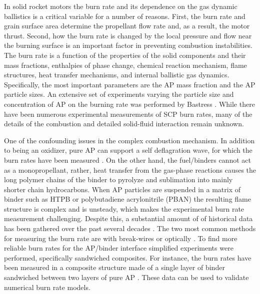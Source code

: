 \documentclass[colorinlistoftodos,review]{elsarticle}
\begin{document}
In solid rocket motors the burn rate and its dependence on the gas dynamic ballistics is a critical variable for a number of reasons.
First, the burn rate and grain surface area determine the propellant flow rate and, as a result, the motor thrust.
Second, how the burn rate is changed by the local pressure and flow near the burning surface is an important factor in preventing combustion instabilities.
The burn rate is a function of the properties of the solid components and their mass fractions, enthalpies of phase change, chemical reaction mechanism, flame structures, heat transfer mechanisms, and internal ballistic gas dynamics.
Specifically, the most important parameters are the AP mass fraction and the AP particle sizes.
An extensive set of experiments varying the particle size and concentration of AP on the burning rate was performed by Bastress \cite{bastress1961modification}.
While there have been numerous experimental measurements of SCP burn rates, many of the details of the combustion and detailed solid-fluid interaction remain unknown.

One of the confounding issues in the complex combustion mechanism.
In addition to being an oxidizer, pure AP can support a self deflagration wave, for which the burn rates have been measured \cite{Shannon1961,price1983combustion,boggs1970deflagration,levy1961further,watt1970deflagration}.
On the other hand, the fuel\slash binders cannot act as a monopropellant, rather, heat transfer from the gas-phase reactions causes the long polymer chains of the binder to pyrolyze and sublimation into mainly shorter chain hydrocarbons.
When AP particles are suspended in a matrix of binder such as HTPB or polybutadiene acrylonitrile (PBAN) the resulting flame structure is complex and is unsteady, which makes the experimental burn rate measurement challenging.
Despite this, a substantial amount of of historical data has been gathered over the past several decades \cite{hayakawa2000effect, kohga2011burning}.
The two most common methods for measuring the burn rate are with break-wires \cite{crawford1947direct} or optically \cite{eisenreich1987optical, rezaiguia2016flame, kohga2011burning, atwood1999burning, atwood1999burning2}.
To find more reliable burn rates for the AP\slash binder interface simplified experiments were performed, specifically sandwiched composites.
For instance, the burn rates have been measured in a composite structure made of a single layer of binder sandwiched between two layers of pure AP \cite{price1983combustion, knott2002modeling, strahle1973catalytic}.
These data can be used to validate numerical burn rate models.
\end{document}
